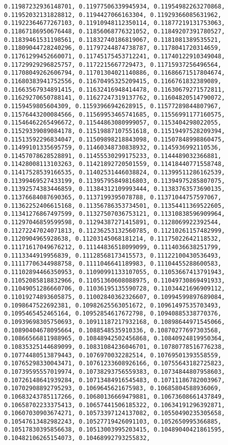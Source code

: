 \documentclass[11pt]{article}
\begin{document}
\begin{Verbatim}[commandchars=\\\{\}]
0.11987232936148701, 0.11977506339945934, 0.11954982263270868, 0.11952032131828812, 0.1194427066163304, 0.11929366085631962, 0.11922364677267103, 0.11910948112350114, 0.11877219131753063, 0.11867186950676448, 0.11856068776321052, 0.11849207391780527, 0.11839461531198561, 0.11832740186819067, 0.1181081389535521, 0.11809044728240296, 0.11797244874738787, 0.1178041720314659, 0.11761299452660071, 0.11745175453712241, 0.11740122910349048, 0.11729929296825757, 0.1172215667729473, 0.11715937256496564, 0.11708049262606794, 0.11701304021140886, 0.11686671517804674, 0.11680383941752556, 0.11670495325209415, 0.1166761832389089, 0.11663567934891415, 0.11632416948414478, 0.11630679271572811, 0.11629270650788141, 0.11627247319137762, 0.11604820514790072, 0.1159459805604309, 0.11593966942628915, 0.11577289844807967, 0.11576443200084566, 0.11569953465741685, 0.11556991177160575, 0.11546462265496672, 0.11544863080999057, 0.1153404298022055, 0.11529339089084178, 0.11519887107551618, 0.11519497528209394, 0.11513592296834047, 0.11509898218843098, 0.11507848998860475, 0.11499101335695759, 0.11460348730838932, 0.1145936992110536, 0.11457078628528891, 0.11455530299175233, 0.1144489032366881, 0.11428008113103263, 0.11421892720501559, 0.11418440771558748, 0.11417528539166535, 0.11402531446038824, 0.11399511286162539, 0.11399469527433199, 0.11395795849816803, 0.11394975285807075, 0.11392574383446859, 0.11384312109993444, 0.11383763573690135, 0.11376684087690365, 0.1137199395078788, 0.11371044757597067, 0.11362252406615168, 0.11356786353734501, 0.11354411369522605, 0.11341276867497599, 0.11327507036753121, 0.11310838596909964, 0.11297046859599598, 0.11294387271415891, 0.1128069922392544, 0.11272247024071813, 0.11236253132560785, 0.11210261157482999, 0.1120904965928638, 0.11203145068181214, 0.11175022642118532, 0.11171617049676212, 0.11144836518099099, 0.1114036638251799, 0.1113344919956839, 0.11128568173415573, 0.11122100430536493, 0.11117706344988758, 0.1111046641189983, 0.11104455288600583, 0.11102894466350953, 0.11090991133107055, 0.11053667413791943, 0.11052085818832966, 0.11051360608088975, 0.11049730869491933, 0.11049051286660706, 0.11036195135590728, 0.11034421696909112, 0.11019274893605875, 0.11002840362326607, 0.10994599897689084, 0.1098647522692381, 0.10982625563051672, 0.10961497535703493, 0.1095465452465164, 0.10952854617672798, 0.10940885338770376, 0.10939698305750693, 0.10911187217932168, 0.10898644971545066, 0.10890404678095664, 0.1088548535910336, 0.10870277697303568, 0.10866566811988965, 0.10848942502456868, 0.10840924819950364, 0.10835325144689099, 0.10831084236046701, 0.10780778516776238, 0.10774480513879443, 0.1076970032282514, 0.10769501393558559, 0.10765298330043471, 0.10761233608926166, 0.10755643182725823, 0.10739595557019974, 0.10738293756559383, 0.10734844807958603, 0.10726148641939284, 0.10713484916545483, 0.10711186782003967, 0.10702908892795293, 0.1069645621675983, 0.10685804588936069, 0.10683243785117266, 0.10680136669479881, 0.10673608661437849, 0.10658702233375413, 0.10657441506185322, 0.10634191296392871, 0.10607030903674271, 0.10573397124137082, 0.10550490235305658, 0.10547613482982243, 0.10527719426091103, 0.1052650995366885, 0.10517830395856638, 0.10513003995203415, 0.10489040421861595, 0.10482106265154073, 0.10468992793255832, 
\end{Verbatim}
\end{document}
